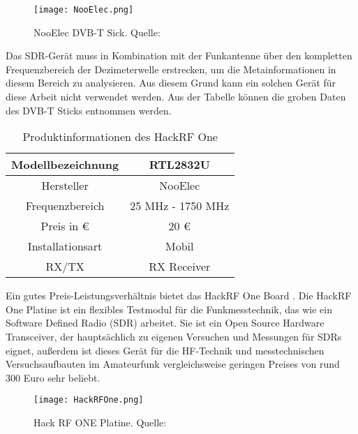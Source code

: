 \begin{figure}[H]
	\centering
	\texttt{[image: NooElec.png]}
	\caption[NooElec DVB-T Stick]{NooElec DVB-T Sick. Quelle: \cite{NooElec:2018}} 
	\label{NooElec}
\end{figure}

Das SDR-Gerät muss in Kombination mit der Funkantenne über den kompletten Frequenzbereich der Dezimeterwelle erstrecken, um die Metainformationen in diesem Bereich zu analysieren. Aus diesem Grund kann ein solchen Gerät für diese Arbeit nicht verwendet werden. Aus der Tabelle können die groben Daten des DVB-T Sticks entnommen werden.\\

\begin{table}[h]
	\centering
	\begin{tabular}{c|c}
		Modellbezeichnung & RTL2832U\\
		\hline
		Hersteller & NooElec\\ 
		\hline 
		Frequenzbereich & 25 MHz - 1750 MHz \\ 
		\hline 
		Preis in \euro & 20 \euro \\ 
		\hline 
		Installationsart & Mobil \\ 
		\hline 
		RX/TX & RX Receiver \\ 
	\end{tabular} 
	\caption{Produktinformationen des HackRF One}
\end{table}

Ein gutes Preis-Leistungsverhältnis bietet das HackRF One Board \cite{greatscott}. Die HackRF One Platine ist ein flexibles Testmodul für die Funkmesstechnik, das wie ein Software Defined Radio (SDR) arbeitet. Sie ist ein Open Source Hardware Transceiver, der hauptsächlich zu eigenen Versuchen und Messungen für SDRs eignet, außerdem ist dieses Gerät für die HF-Technik und messtechnischen Versuchsaufbauten im Amateurfunk vergleichsweise geringen Preises von rund 300 Euro sehr beliebt.\\

\begin{figure}[H]
	\centering
	\texttt{[image: HackRFOne.png]}
	\caption[Hack RF ONE Platine]{Hack RF ONE Platine. Quelle: \cite{HackRFOne:2018}} 
	\label{HackRFOne}
\end{figure}

